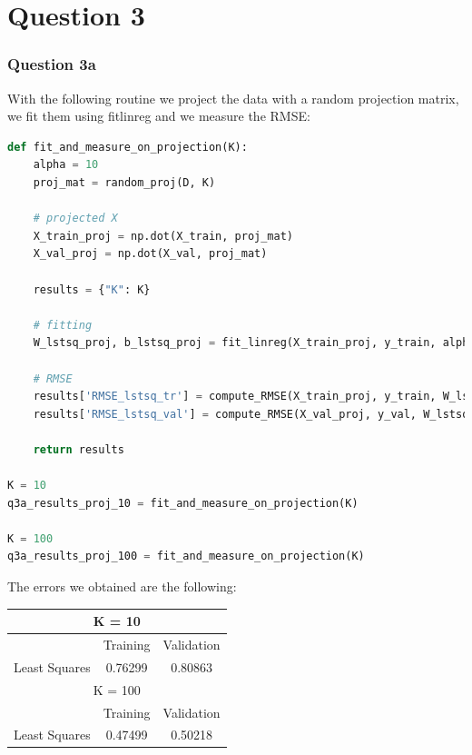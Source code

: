 \documentclass{article}
\begin{document}
\section*{Question 3}

\subsubsection*{Question 3a}

With the following routine we project the data with a random projection matrix, we fit them using fitlinreg and we measure the RMSE:

\begin{lstlisting}[language=Python]
def fit_and_measure_on_projection(K):
    alpha = 10
    proj_mat = random_proj(D, K)

    # projected X
    X_train_proj = np.dot(X_train, proj_mat)
    X_val_proj = np.dot(X_val, proj_mat)

    results = {"K": K}

    # fitting
    W_lstsq_proj, b_lstsq_proj = fit_linreg(X_train_proj, y_train, alpha)

    # RMSE
    results['RMSE_lstsq_tr'] = compute_RMSE(X_train_proj, y_train, W_lstsq_proj, b_lstsq_proj)
    results['RMSE_lstsq_val'] = compute_RMSE(X_val_proj, y_val, W_lstsq_proj, b_lstsq_proj)
    
    return results

K = 10
q3a_results_proj_10 = fit_and_measure_on_projection(K)

K = 100
q3a_results_proj_100 = fit_and_measure_on_projection(K)
\end{lstlisting}


The errors we obtained are the following:
\begin{center}
\begin{tabular}{ | c | c | c | }
\hline
\multicolumn{3}{|c|}{ K = 10 } \\
\hline
 & Training & Validation \\
\hline
Least Squares & 0.76299 & 0.80863\\ 
\hline

\hline 
\hline

\multicolumn{3}{|c|}{ K = 100 } \\
\hline
 & Training & Validation \\
\hline
Least Squares & 0.47499 & 0.50218 \\ 
\hline
\end{tabular}
\end{center}
\end{document}
